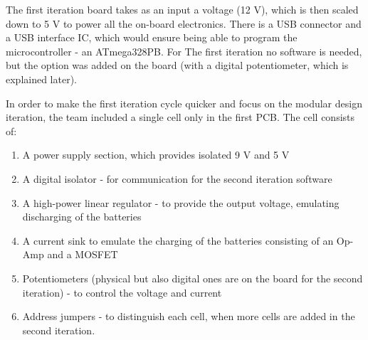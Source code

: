 The first iteration board takes as an input a voltage (12 V), which
is then scaled down to 5 V to power all the on-board electronics. 
There is a USB connector and a USB interface IC, which would ensure 
being able to program the microcontroller - an ATmega328PB. For The
first iteration no software is needed, but the option was added on the 
board (with a digital potentiometer, which is explained later).

In order to make the first iteration cycle quicker and focus on 
the modular design iteration, the team included a single cell 
only in the first PCB. The cell consists of:
\begin{enumerate}
    \item A power supply section, which provides isolated 9 V and 5 V
    \item A digital isolator - for communication for the second 
    iteration software
    \item A high-power linear regulator - to provide the output 
    voltage, emulating discharging of the batteries
    \item A current sink to emulate the charging of the batteries 
    consisting of an Op-Amp and a MOSFET
    \item Potentiometers (physical but also digital ones are on 
    the board for the second iteration) - to control the voltage
    and current
    \item Address jumpers - to distinguish each cell, when more 
    cells are added in the second iteration.
\end{enumerate}
